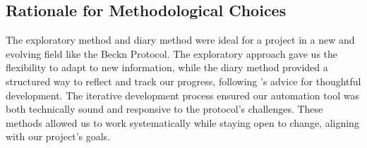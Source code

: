 \subsection{Rationale for Methodological Choices}
The exploratory method and diary method were ideal for a project in a new and evolving field like the Beckn Protocol. The exploratory approach gave us the flexibility to adapt to new information, while the diary method provided a structured way to reflect and track our progress, following \citet{Naur1983}’s advice for thoughtful development. The iterative development process ensured our automation tool was both technically sound and responsive to the protocol’s challenges. These methods allowed us to work systematically while staying open to change, aligning with our project’s goals.